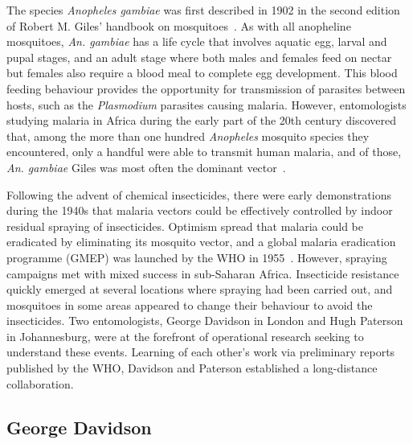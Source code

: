\begin{refsection}
The species \textit{Anopheles gambiae} was first described in 1902 in the second edition of Robert M. Giles' handbook on mosquitoes~\parencite{Giles1902}.
%
As with all anopheline mosquitoes, \textit{An. gambiae} has a life cycle that involves aquatic egg, larval and pupal stages, and an adult stage where both males and females feed on nectar but females also require a blood meal to complete egg development.
%
This blood feeding behaviour provides the opportunity for transmission of parasites between hosts, such as the \textit{Plasmodium} parasites causing malaria.
%
However, entomologists studying malaria in Africa during the early part of the 20th century discovered that, among the more than one hundred \textit{Anopheles} mosquito species they encountered, only a handful were able to transmit human malaria, and of those, \textit{An. gambiae} Giles was most often the dominant vector~\parencite{DeMeillon1947,DeMeillon1950,Gillies1968}.

Following the advent of chemical insecticides, there were early demonstrations during the 1940s that malaria vectors could be effectively controlled by indoor residual spraying of insecticides.
%
Optimism spread that malaria could be eradicated by eliminating its mosquito vector, and a global malaria eradication programme (GMEP) was launched by the WHO in 1955~\parencite{Najera2011}.
%
However, spraying campaigns met with mixed success in sub-Saharan Africa.
%
Insecticide resistance quickly emerged at several locations where spraying had been carried out, and mosquitoes in some areas appeared to change their behaviour to avoid the insecticides.
%
Two entomologists, George Davidson in London and Hugh Paterson in Johannesburg, were at the forefront of operational research seeking to understand these events.
%
Learning of each other's work via preliminary reports published by the WHO, Davidson and Paterson established a long-distance collaboration.


\subsection{George Davidson}\label{subsec:george-davidson}


\end{refsection}
